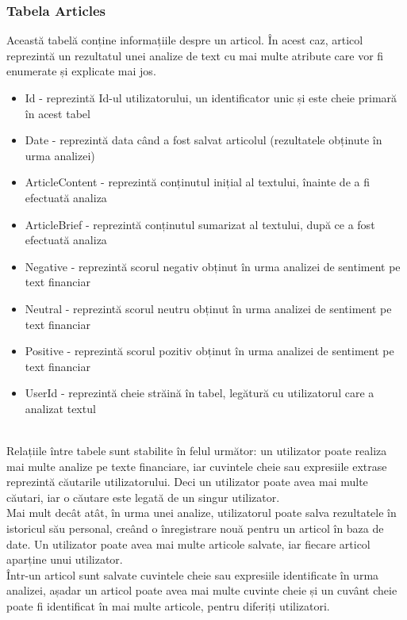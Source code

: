 \subsubsection{Tabela Articles}
Această tabelă conține informațiile despre un articol. În acest caz, articol reprezintă un rezultatul unei analize de text cu mai multe atribute care vor fi enumerate și explicate mai jos.
\begin{itemize}
	\setlength\itemsep{0.5em}
	\item Id - reprezintă Id-ul utilizatorului, un identificator unic și este cheie primară în acest tabel
	\item Date - reprezintă data când a fost salvat articolul (rezultatele obținute în urma analizei)
	\item ArticleContent - reprezintă conținutul inițial al textului, înainte de a fi efectuată analiza
	\item ArticleBrief - reprezintă conținutul sumarizat al textului, după ce a fost efectuată analiza
	\item Negative - reprezintă scorul negativ obținut în urma analizei de sentiment pe text financiar
	\item Neutral - reprezintă scorul neutru obținut în urma analizei de sentiment pe text financiar
	\item Positive - reprezintă scorul pozitiv obținut în urma analizei de sentiment pe text financiar
	\item UserId - reprezintă cheie străină în tabel, legătură cu utilizatorul care a analizat textul
\end{itemize}
\ \\
Relațiile între tabele sunt stabilite în felul următor: un utilizator poate realiza mai multe analize pe texte financiare, iar cuvintele cheie sau expresiile extrase reprezintă căutarile utilizatorului.
Deci un utilizator poate avea mai multe căutari, iar o căutare este legată de un singur utilizator.\\

\noindent Mai mult decât atât, în urma unei analize, utilizatorul poate salva rezultatele în istoricul său personal, creând o înregistrare nouă pentru un articol în baza de date. 
Un utilizator poate avea mai multe articole salvate, iar fiecare articol aparține unui utilizator. \\

\noindent Într-un articol sunt salvate cuvintele cheie sau expresiile identificate în urma analizei, așadar un articol poate avea mai multe cuvinte cheie și un cuvânt cheie poate fi identificat în mai multe articole, pentru diferiți utilizatori.\\

